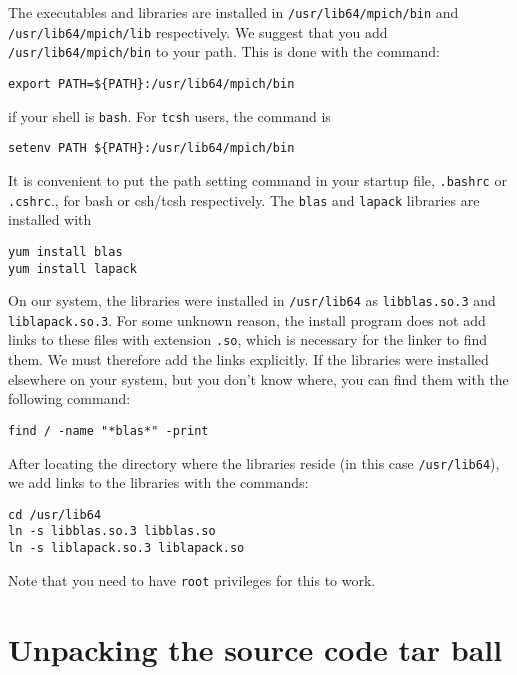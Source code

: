 \documentclass[11pt]{article}
\begin{document}
The executables and libraries are installed in \verb+/usr/lib64/mpich/bin+ and  \verb+/usr/lib64/mpich/lib+ respectively. We suggest that you add \verb+/usr/lib64/mpich/bin+ to your path. This is done with the command:
\begin{verbatim}
export PATH=${PATH}:/usr/lib64/mpich/bin
\end{verbatim}
if your shell is \verb+bash+. For \verb+tcsh+ users, the command is
\begin{verbatim}
setenv PATH ${PATH}:/usr/lib64/mpich/bin
\end{verbatim}
It is convenient to put the path setting command in your startup file, \verb+.bashrc+ or \verb+.cshrc+., for bash or csh/tcsh respectively.
The \verb+blas+ and \verb+lapack+ libraries are installed with
\begin{verbatim}
yum install blas
yum install lapack
\end{verbatim}
On our system, the libraries were installed in \verb+/usr/lib64+ as \verb+libblas.so.3+ and \verb+liblapack.so.3+. For some unknown reason, the install program does not add links to these files with extension \verb+.so+, which is necessary for the linker to find them. We must therefore add the links explicitly. If the libraries were installed elsewhere on your system, but you don't know where, you can find them with the following command:
\begin{verbatim}
find / -name "*blas*" -print
\end{verbatim}
After locating the directory where the libraries reside (in this case \verb+/usr/lib64+), we add
links to the libraries with the commands:
\begin{verbatim}
cd /usr/lib64
ln -s libblas.so.3 libblas.so
ln -s liblapack.so.3 liblapack.so
\end{verbatim}
Note that you need to have \verb+root+ privileges for this to work.

\section{Unpacking the source code tar ball}
\end{document}
